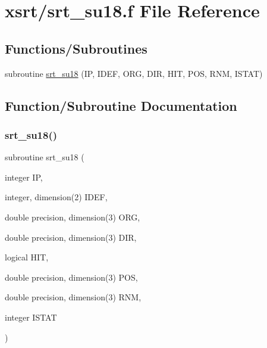 \hypertarget{srt__su18_8f}{}\section{xsrt/srt\+\_\+su18.f File Reference}
\label{srt__su18_8f}
\subsection*{Functions/\+Subroutines}
\begin{DoxyCompactItemize}
\item 
subroutine \hyperlink{srt__su18_8f_a985a1d0219f4c57a05dd77821e3d91dd}{srt\+\_\+su18} (IP, I\+D\+EF, O\+RG, D\+IR, H\+IT, P\+OS, R\+NM, I\+S\+T\+AT)
\end{DoxyCompactItemize}


\subsection{Function/\+Subroutine Documentation}
\mbox{\label{srt__su18_8f_a985a1d0219f4c57a05dd77821e3d91dd}} 
\subsubsection{\texorpdfstring{srt\+\_\+su18()}{srt\_su18()}}
{\footnotesize\ttfamily subroutine srt\+\_\+su18 (\begin{DoxyParamCaption}\item[{integer}]{IP,  }\item[{integer, dimension(2)}]{I\+D\+EF,  }\item[{double precision, dimension(3)}]{O\+RG,  }\item[{double precision, dimension(3)}]{D\+IR,  }\item[{logical}]{H\+IT,  }\item[{double precision, dimension(3)}]{P\+OS,  }\item[{double precision, dimension(3)}]{R\+NM,  }\item[{integer}]{I\+S\+T\+AT }\end{DoxyParamCaption})}

